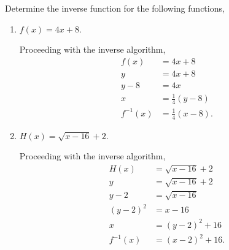 \documentclass[12pt]{article} %
\begin{document}
  
\newpage


\begin{qstn}
  Determine the inverse function for the following functions,
  \begin{enumerate}[label=(\alph*)]
    \item $f(x) = 4x + 8$.
      \begin{solution}
        Proceeding with the inverse algorithm,
        \begin{align*}
              f(x) &= 4x + 8\\
              y &= 4x + 8\\
              y - 8 &= 4x\\
              x &= \frac{1}{4}(y - 8)\\
              f^{-1}(x) &= \frac{1}{4}(x - 8)
        .\end{align*}
      \end{solution}

      \vspace*{2cm}

    \item $H(x) = \sqrt{x - 16} + 2$.
      \begin{solution}
        Proceeding with the inverse algorithm,
        \begin{align*}
          H(x) &= \sqrt{x - 16} + 2\\
          y &= \sqrt{x - 16}  + 2\\
          y - 2 &= \sqrt{x - 16} \\
          (y - 2)^2 &= x - 16\\
          x &= (y - 2)^2 + 16\\
          f^{-1}(x) &= (x - 2)^2 + 16
        .\end{align*}
      \end{solution}
  \end{enumerate}
\end{qstn}

\newpage
\end{document}
